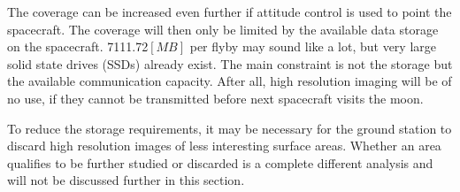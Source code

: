 The coverage can be increased even further if attitude control is used to point the spacecraft. The coverage will then only be limited by the available data storage on the spacecraft. 7111.72$[MB]$ per flyby may sound like a lot, but very large solid state drives (SSDs) already exist. The main constraint is not the storage but the available communication capacity. After all, high resolution imaging will be of no use, if they cannot be transmitted before next spacecraft visits the moon. 

To reduce the storage requirements, it may be necessary for the ground station to discard high resolution images of less interesting surface areas. Whether an area qualifies to be further studied or discarded is a complete different analysis and will not be discussed further in this section.

